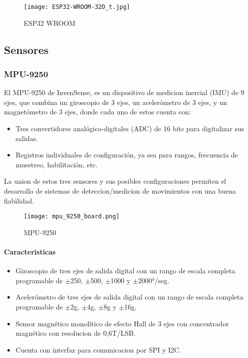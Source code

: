     \begin{figure}[htp!]
        \centering
        \texttt{[image: ESP32-WROOM-32D\_t.jpg]}
        \caption{ESP32 WROOM}
        \label{fig: esp32}
    \end{figure}
    \FloatBarrier

    \subsection{Sensores}    
        \subsubsection{MPU-9250}
            El MPU-9250 de InvenSense, es un dispositivo de medicion inercial (IMU) de 9 ejes, que combina 
            un giroscopio de 3 ejes, un acelerómetro de 3 ejes, y un magnetómetro de 3 ejes, donde cada 
            uno de estos cuenta con:
                \begin{itemize}
                    \item Tres convertidores analógico-digitales (ADC) de 16 bits para digitalizar sus salidas. 
                    \item Registros individuales de configuración, ya sea para rangos, frecuencia de muestreo, habilitación, etc.
                \end{itemize}

            La union de estos tres sensores y sus posibles configuraciones permiten el desarrollo de sistemas de deteccion/medicion de 
            movimientos con una buena fiabilidad. 

                \begin{figure}[htp]
                    \centering
                        \texttt{[image: mpu\_9250\_board.png]}
                        \caption{MPU-9250 }
                \end{figure}

            \paragraph{Caracteristicas}
                \begin{itemize}
                    \item Giroscopio de tres ejes de salida digital con un rango de escala completa programable de $ \pm $250, $ \pm $500, $ \pm $1000 y $ \pm $2000°/seg.
                    \item Acelerómetro de tres ejes de salida digital con un rango de escala completa programable de $ \pm $2g, $ \pm $4g, $ \pm $8g y $ \pm $16g.
                    \item Sensor magnético monolítico de efecto Hall de 3 ejes con concentrador magnético con resolucion de 0,6T/LSB.
                    \item Cuenta con interfaz para comunicacion por SPI y I2C.
                \end{itemize}

